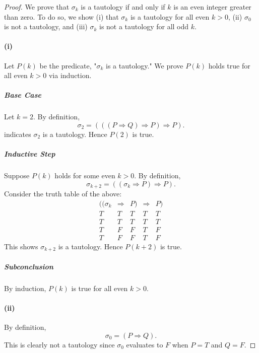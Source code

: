 \documentclass{report}
\begin{document}
  \begin{proof}

    We prove that $\sigma_k$ is a tautology if and only if $k$ is an even
      integer greater than zero.
    To do so, we show (i) that $\sigma_k$ is a tautology for all even $k > 0$,
      (ii) $\sigma_0$ is not a tautology, and (iii) $\sigma_k$ is not a
      tautology for all odd $k$.

    \paragraph{(i)}%

      Let $P(k)$ be the predicate, "$\sigma_k$ is a tautology."
      We prove $P(k)$ holds true for all even $k > 0$ via induction.

      \subparagraph{Base Case}%

        Let $k = 2$.
        By definition,
          $$\sigma_2 = (((P \Rightarrow Q) \Rightarrow P) \Rightarrow P).$$
         indicates $\sigma_2$ is a tautology.
        Hence $P(2)$ is true.

      \subparagraph{Inductive Step}%

        Suppose $P(k)$ holds for some even $k > 0$.
        By definition,
          $$\sigma_{k + 2} = ((\sigma_{k} \Rightarrow P) \Rightarrow P).$$
        Consider the truth table of the above:
          $$\begin{array}{c|c|s|e|s}
            ((\sigma_k & \Rightarrow & P) & \Rightarrow & P) \\
            \hline
            T & T & T & T & T \\
            T & T & T & T & T \\
            T & F & F & T & F \\
            T & F & F & T & F
          \end{array}$$
        This shows $\sigma_{k+2}$ is a tautology.
        Hence $P(k + 2)$ is true.

      \subparagraph{Subconclusion}%

        By induction, $P(k)$ is true for all even $k > 0$.

    \paragraph{(ii)}%

      By definition, $$\sigma_0 = (P \Rightarrow Q).$$
      This is clearly not a tautology since $\sigma_0$ evaluates to $F$ when
        $P = T$ and $Q = F$.


\end{proof}
\end{document}
